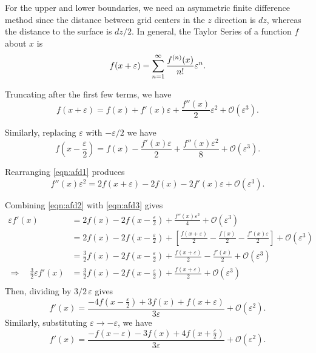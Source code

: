 For the upper and lower boundaries, we need an asymmetric finite difference
method since the distance between grid centers in the $z$ direction is $dz$, whereas the distance to the surface is $dz/2$.
In general, the Taylor Series of a function $f$ about $x$ is
\begin{equation*}
  f(x+\varepsilon) = \sum_{n=1}^\infty \frac{f^{(n)}(x)}{n!} \varepsilon^n. \\
\end{equation*}

Truncating after the first few terms, we have
\begin{equation}
  \label{eqn:afd1}
  f(x+\varepsilon)  = f(x) + f'(x)\varepsilon + \frac{f''(x)}{2}\varepsilon^2 + \mathcal{O}(\varepsilon^3).
\end{equation}

Similarly, replacing $\varepsilon$ with $-\varepsilon/2$ we have
\begin{equation}
  \label{eqn:afd2}
  f(x-\frac{\varepsilon}{2}) = f(x) - \frac{f'(x)\varepsilon}{2} + \frac{f''(x)\varepsilon^2}{8} + \mathcal{O}(\varepsilon^3).
\end{equation}

Rearranging \eqref{eqn:afd1} produces
\begin{equation}
  \label{eqn:afd3}
  f''(x)\varepsilon^2 = 2f(x+\varepsilon) - 2f(x) - 2f'(x)\varepsilon + \mathcal{O}(\varepsilon^3).
\end{equation}

Combining \eqref{eqn:afd2} with \eqref{eqn:afd3} gives
\begin{align*}
  \varepsilon f'(x) &= 2f(x) - 2f(x-\frac{\varepsilon}{2}) + \frac{f''(x)\varepsilon^2}{4} + \mathcal{O}(\varepsilon^3) \\
  &= 2f(x) - 2f(x-\frac{\varepsilon}{2}) + \left[ \frac{f(x+\varepsilon)}{2} - \frac{f(x)}{2} - \frac{f'(x)\varepsilon}{2} \right] + \mathcal{O}(\varepsilon^3) \\
  &= \frac{3}{2}f(x) - 2f(x-\frac{\varepsilon}{2}) + \frac{f(x+\varepsilon)}{2} - \frac{f'(x)}{2} + \mathcal{O}(\varepsilon^3) \\
 \Rightarrow \quad \frac{3}{2}\varepsilon f'(x) &= \frac{3}{2}f(x) - 2f(x-\frac{\varepsilon}{2}) + \frac{f(x+\varepsilon)}{2} + \mathcal{O}(\varepsilon^3) \\
\end{align*}
Then, dividing by $3/2\, \varepsilon$ gives
\begin{equation}
  f'(x) = \frac{-4f(x-\frac{\varepsilon}{2}) + 3f(x) + f(x+\varepsilon)}{3\varepsilon} + \mathcal{O}(\varepsilon^2).
\end{equation}
Similarly, substituting $\varepsilon \to -\varepsilon$, we have
\begin{equation}
  f'(x) = \frac{- f(x-\varepsilon) - 3f(x) + 4f(x+\frac{\varepsilon}{2})}{3\varepsilon} + \mathcal{O}(\varepsilon^2).
\end{equation}



